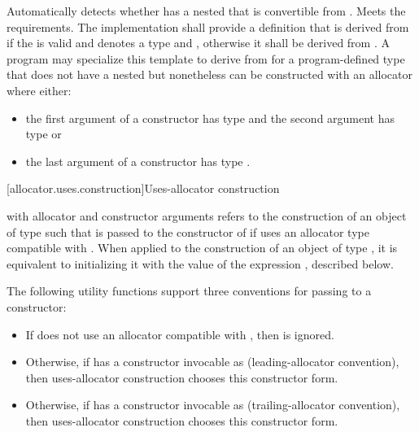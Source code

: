 \begin{itemdescr}
\pnum
\remarks
Automatically detects whether  has a nested  that
is convertible from . Meets the 
requirements. The implementation shall provide a definition that is
derived from  if the  
is valid and denotes a type and
, otherwise it shall be
derived from . A program may specialize this template to derive from
 for a program-defined type  that does not have a nested
 but nonetheless can be constructed with an allocator where
either:
\begin{itemize}
\item the first argument of a constructor has type  and the
second argument has type  or

\item the last argument of a constructor has type .
\end{itemize}
\end{itemdescr}

[allocator.uses.construction]{Uses-allocator construction}

\pnum
{}
with allocator  and constructor arguments 
refers to the construction of an object of type 
such that  is passed to the constructor of 
if  uses an allocator type compatible with .
When applied to the construction of an object of type ,
it is equivalent to initializing it with the value of the expression
, described below.

\pnum
The following utility functions support
three conventions for passing  to a constructor:
\begin{itemize}
\item
  If  does not use an allocator compatible with ,
  then  is ignored.
\item
  Otherwise, if  has a constructor invocable as
   (leading-allocator convention),
  then uses-allocator construction chooses this constructor form.
\item
  Otherwise, if  has a constructor invocable as
   (trailing-allocator convention),
  then uses-allocator construction chooses this constructor form.
\end{itemize}

